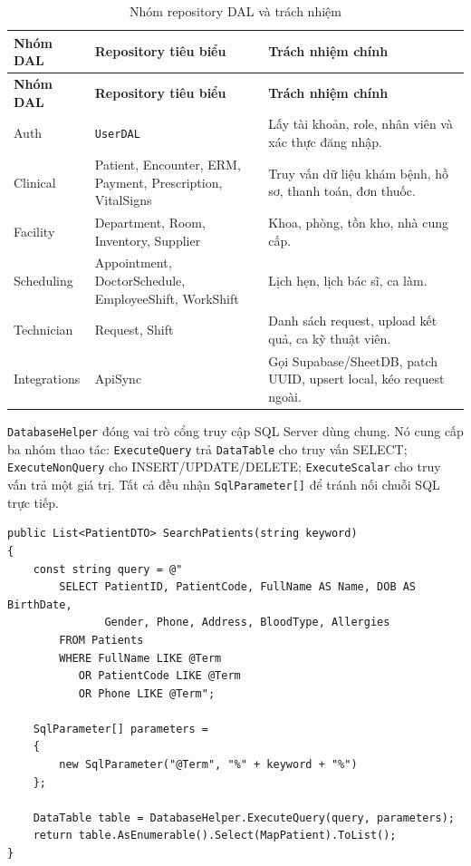 \documentclass[12pt,a4paper]{article}
\numberwithin{figure}{subsection}
\numberwithin{table}{subsection}
\newcounter{codecounter}
\newenvironment{codeblock}[2]{%
    \refstepcounter{codecounter}%
    \phantomsection%
    \label{#1}%
    \par\smallskip
}{%
    \par\smallskip
}
\begin{document}
\begin{longtable}{|p{4cm}|p{4.8cm}|p{5cm}|}
\caption{Nhóm repository DAL và trách nhiệm} \\
\hline
\textbf{Nhóm DAL} & \textbf{Repository tiêu biểu} & \textbf{Trách nhiệm chính} \\
\hline
\endfirsthead
\hline
\textbf{Nhóm DAL} & \textbf{Repository tiêu biểu} & \textbf{Trách nhiệm chính} \\
\hline
\endhead
Auth & \texttt{UserDAL} & Lấy tài khoản, role, nhân viên và xác thực đăng nhập. \\
\hline
Clinical & Patient, Encounter, ERM, Payment, Prescription, VitalSigns & Truy vấn dữ liệu khám bệnh, hồ sơ, thanh toán, đơn thuốc. \\
\hline
Facility & Department, Room, Inventory, Supplier & Khoa, phòng, tồn kho, nhà cung cấp. \\
\hline
Scheduling & Appointment, DoctorSchedule, EmployeeShift, WorkShift & Lịch hẹn, lịch bác sĩ, ca làm. \\
\hline
Technician & Request, Shift & Danh sách request, upload kết quả, ca kỹ thuật viên. \\
\hline
Integrations & ApiSync & Gọi Supabase/SheetDB, patch UUID, upsert local, kéo request ngoài. \\
\hline
\end{longtable}

\texttt{DatabaseHelper} đóng vai trò cổng truy cập SQL Server dùng chung. Nó cung cấp ba nhóm thao tác: \texttt{ExecuteQuery} trả \texttt{DataTable} cho truy vấn SELECT; \texttt{ExecuteNonQuery} cho INSERT/UPDATE/DELETE; \texttt{ExecuteScalar} cho truy vấn trả một giá trị. Tất cả đều nhận \texttt{SqlParameter[]} để tránh nối chuỗi SQL trực tiếp.

\begin{codeblock}{code:patient-search}{Minh họa tìm kiếm bệnh nhân}
\begin{verbatim}
public List<PatientDTO> SearchPatients(string keyword)
{
    const string query = @"
        SELECT PatientID, PatientCode, FullName AS Name, DOB AS BirthDate,
               Gender, Phone, Address, BloodType, Allergies
        FROM Patients
        WHERE FullName LIKE @Term
           OR PatientCode LIKE @Term
           OR Phone LIKE @Term";

    SqlParameter[] parameters =
    {
        new SqlParameter("@Term", "%" + keyword + "%")
    };

    DataTable table = DatabaseHelper.ExecuteQuery(query, parameters);
    return table.AsEnumerable().Select(MapPatient).ToList();
}
\end{verbatim}
\end{codeblock}
\end{document}
